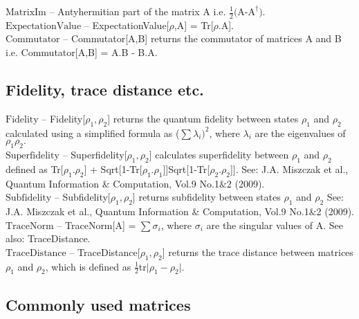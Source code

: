 \noindent\textbf{$ \text{MatrixIm} $ }-- Antyhermitian part of the matrix A i.e. $ \frac{1}{2}\text{(A-A} ^{\dagger }\text{).} $\\[6pt]

\noindent\textbf{$ \text{ExpectationValue} $ }-- ExpectationValue[$\rho $,A] = Tr[$\rho $.A].$  $\\[6pt]

\noindent\textbf{$ \text{Commutator} $ }-- Commutator[A,B] returns the commutator of matrices A and B i.e. Commutator[A,B] = A.B - B.A.$  $\\[6pt]

\subsection{Fidelity, trace distance etc.}

\noindent\textbf{$ \text{Fidelity} $ }-- Fidelity[$ \rho _1,\rho _2 $] returns the quantum fidelity between states $ \rho _1 $ and $ \rho _2 $ calculated using a simplified formula as ($\sum $$ \lambda _i)^2 $, where $ \lambda _i $ are the eigenvalues of $ \rho _1\rho _2. $\\[6pt]

\noindent\textbf{$ \text{Superfidelity} $ }-- Superfidelity[$ \rho _1,\rho _2 $] calculates superfidelity between $ \rho _1 $ and $ \rho _2 $ defined as Tr[$ \rho _1.\rho _2 $] + Sqrt[1-Tr[$ \rho _1.\rho _1 $]]Sqrt[1-Tr[$ \rho _2.\rho _2 $]]. See: J.A. Miszczak et al., Quantum Information $\&$ Computation, Vol.9 No.1$\&$2 (2009).$  $\\[6pt]

\noindent\textbf{$ \text{Subfidelity} $ }-- Subfidelity[$ \rho _1,\rho _2 $] returns subfidelity between states $ \rho _1 $ and $ \rho _2 $ See: J.A. Miszczak et al., Quantum Information $\&$ Computation, Vol.9 No.1$\&$2 (2009).$  $\\[6pt]

\noindent\textbf{$ \text{TraceNorm} $ }-- TraceNorm[A] = $\sum $$ \sigma _i $, where $ \sigma _i $ are the singular values of A. See also: TraceDistance.$  $\\[6pt]

\noindent\textbf{$ \text{TraceDistance} $ }-- TraceDistance[$ \rho _1,\rho _2 $] returns the trace distance between matrices $ \rho _1 $ and $ \rho _2 $, which is defined as $ \frac{1}{2} $tr$|$$ \rho _1-\rho _2\text{$|$.} $\\[6pt]

\subsection{Commonly used matrices}

